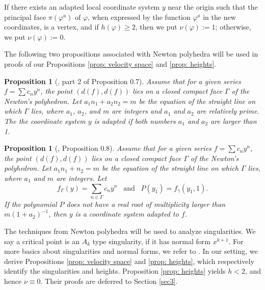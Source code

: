 \documentclass[12pt]{amsart}
\newtheorem{proposition}[theorem]{Proposition}
\begin{document}
If there exists an adapted local coordinate system $y$ near the origin such that the principal face $\pi\left(\varphi^{a}\right)$ of $\varphi$, when expressed by the function $\varphi^{a}$ in the new coordinates, is a vertex, and if $h\left(\varphi\right)\geq 2$, then we put $\nu\left(\varphi\right):=1$; otherwise, we put $\nu\left(\varphi\right):=0$.

The following two propositions associated with Newton polyhedra will be used in proofs of our Propositions \ref{prop: velocity space} and \ref{prop: heights}.

\begin{proposition}[\cite{V76}, part 2 of Proposition 0.7]\label{proposition: A_{3}-type singularity}
		Assume that for a given series $f=\sum c_{n}y^{n}$, the point $\left(d\left(f\right),d\left(f\right)\right)$ lies on a closed compact face $\Gamma$ of the Newton's polyhedron. Let $a_{1}n_{1}+a_{2}n_{2}=m$ be the equation of the straight line on which $\Gamma$ lies, where $a_{1}$, $a_{2}$, and $m$ are integers and $a_{1}$ and $a_{2}$ are relatively prime. The the coordinate system $y$ is adapted if both numbers $a_{1}$ and $a_{2}$ are larger than 1.
\end{proposition}
\begin{proposition}[\cite{V76}, Proposition 0.8]\label{prop:V0.8}
    Assume that for a given series $f=\sum c_{n}y^{n}$, the point $\left(d\left(f\right),d\left(f\right)\right)$ lies on a closed compact face $\Gamma$ of the Newton's polyhedron. Let $a_{1}n_{1}+n_{2}=m$ be the equation of the straight line on which $\Gamma$ lies, where $a_{1}$ and $m$ are integers. Let 
    \begin{equation*}
        f_{\Gamma}\left(y\right)=\sum_{n\in\Gamma}c_{n}y^{n}\;\;\;\mathrm{and}\;\;\;P\left(y_{1}\right)=f_{\gamma}\left(y_{1},1\right).
    \end{equation*}
    If the polynomial $P$ does not have a real root of multiplicity larger than $m\left(1+a_{2}\right)^{-1}$, then $y$ is a coordinate system adapted to $f$.
\end{proposition}

The techniques from Newton polyhedra will be used to analyze singularities. We say a critical point is an $A_k$ type singularity, if it has normal form $x^{k+1}$. For more basics about singularities and normal forms, we refer to \cite{A1, A2, A3}.
In our setting, we derive Propositions \ref{prop: velocity space} and \ref{prop: heights}, which respectively identify the singularities and heights. Proposition \ref{prop: heights} yields $h<2$, and hence $\nu\equiv 0$. Their proofs are deferred to Section \ref{sec3}.
\end{document}
